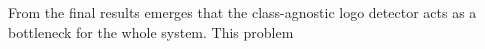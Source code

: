 
From the final results emerges that the class-agnostic logo detector acts as a bottleneck for the whole system. This problem 

